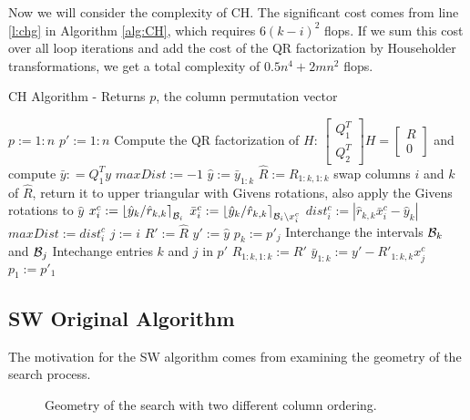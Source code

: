 \documentclass[12pt,Bold,letterpaper]{mcgilletdclass}
\newcommand{\bsmx}{\left[\begin{smallmatrix}}
\newcommand{\esmx}{\end{smallmatrix}\right]}
\begin{document}
Now we will consider the complexity of CH. The 
significant cost comes from line \ref{l:chg} in Algorithm \ref{alg:CH},
which requires $6(k-i)^2$ flops.
If we sum this cost over all loop iterations and add the cost of the QR factorization by Householder transformations, 
we  get a total complexity of $0.5n^4+2mn^2$ flops.

\begin{algorithm}
\caption{CH Algorithm - Returns $p$, the column permutation vector}
\label{alg:CH}
\begin{algorithmic}[1]
\STATE $p := 1:n$
\STATE $p' := 1:n$
\STATE Compute the QR factorization of $H$: $\bsmx Q_1^T \\ Q_2^T \esmx H= \bsmx R\\ 0 \esmx$
             and compute  $\bar{y} : = Q_1^Ty$
  	\STATE $maxDist := -1$
    	\STATE $\hat{y} := \bar{y}_{1:k}$
    	\STATE $\hat{R} := R_{1:k,1:k}$
        \STATE  \label{l:chg} swap columns $i$ and $k$ of $\hat{R}$, return it  to upper
triangular with Givens rotations, also apply the Givens rotations to $\hat{y}$ %
        \STATE $x_i^c := \left \lfloor\hat{y}_k/\hat{r}_{k,k}\right
\rceil_{{\cal B}_i}$
        \STATE $\bar{x}_i^c := \left \lfloor\hat{y}_k/\hat{r}_{k,k}\right
\rceil_{{\cal B}_i\backslash x_i^c}$
        \STATE $dist_i^c := \left | \hat{r}_{k,k}\bar{x}_i^c - \hat{y}_k
\right | $
        	\STATE $maxDist := dist_i^c$
        	\STATE $j := i$
        	\STATE $R' := \hat{R}$
        	\STATE $y' := \hat{y}$
        \ENDIF
    \ENDFOR
    \STATE $p_k := p'_j$
    \STATE Interchange the intervals ${{\cal B}_k}$ and ${{\cal B}_{j}}$
    \STATE Intechange entries $k$ and $j$ in $p'$
    \STATE $R_{1:k,1:k} := R'$
    \STATE $\bar{y}_{1:k} := y' - R'_{1:k,k}x_j^c$
  \ENDFOR
  \STATE $p_1 := p'_1$
\end{algorithmic}
\end{algorithm}

\subsection{SW Original Algorithm} \label{subsec:SW}
The motivation for the SW algorithm comes from examining the geometry of the search process.

\ifx\du\undefined
  \newlength{\du}
\fi
\begin{figure}
\caption{Geometry of the search  with two different column ordering.}
\label{SEGeometry}
\end{figure}
\end{document}
